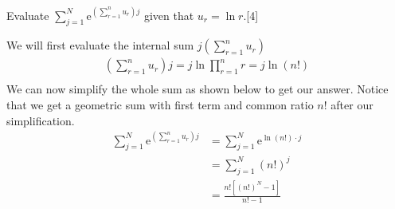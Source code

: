 \documentclass[12pt, a4 paper]{article}
\begin{document}
\begin{outline}[enumerate]
 \1 Evaluate \(\sum\limits_{j=1}^{N}\mathrm{e}^{\left(\sum\limits_{r=1}^{n}u_{r}\right)j}\) given that \(u_{r}=\ln{r}\).\hfill[4]%
 \begin{answer}
  We will first evaluate the internal sum \(j\left(\sum\limits_{r=1}^{n}u_{r}\right)\)
  \begin{align*}
   (\sum\limits_{r=1}^{n}u_{r})j= j\ln\prod_{r=1}^n r = j\ln{(n!)} \\
  \end{align*}
  We can now simplify the whole sum as shown below to get our answer. Notice that we get a geometric sum with first term and common ratio \(n! \) after our simplification.
  \begin{align*}
   \sum\limits_{j=1}^{N}\mathrm{e}^{\left(\sum\limits_{r=1}^{n}u_{r}\right)j} & =      \sum\limits_{j=1}^{N}\mathrm{e}^{\ln(n!) \cdot j} \\
                                                                              & = \sum\limits_{j=1}^{N}{(n!)}^j                          \\
                                                                              & = \frac{n![{(n!)}^N-1]}{n!-1}
  \end{align*}
 \end{answer}

\end{outline}
\end{document}

